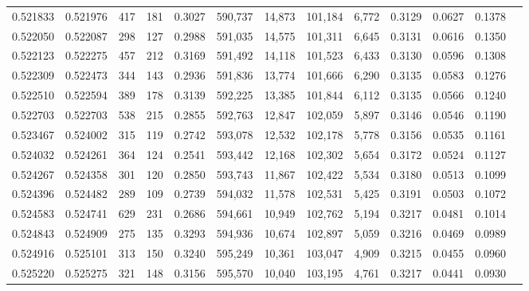 \begin{tabular}{rrrrrrrrrrrrr}
0.521833 & 0.521976 &   417 &   181 &                                     0.3027 & 590,737 &  14,873 & 101,184 &   6,772 & 0.3129 & 0.0627 & 0.1378 \\
0.522050 & 0.522087 &   298 &   127 &                                     0.2988 & 591,035 &  14,575 & 101,311 &   6,645 & 0.3131 & 0.0616 & 0.1350 \\
0.522123 & 0.522275 &   457 &   212 &                                     0.3169 & 591,492 &  14,118 & 101,523 &   6,433 & 0.3130 & 0.0596 & 0.1308 \\
0.522309 & 0.522473 &   344 &   143 &                                     0.2936 & 591,836 &  13,774 & 101,666 &   6,290 & 0.3135 & 0.0583 & 0.1276 \\
0.522510 & 0.522594 &   389 &   178 &                                     0.3139 & 592,225 &  13,385 & 101,844 &   6,112 & 0.3135 & 0.0566 & 0.1240 \\
0.522703 & 0.522703 &   538 &   215 &                                     0.2855 & 592,763 &  12,847 & 102,059 &   5,897 & 0.3146 & 0.0546 & 0.1190 \\
0.523467 & 0.524002 &   315 &   119 &                                     0.2742 & 593,078 &  12,532 & 102,178 &   5,778 & 0.3156 & 0.0535 & 0.1161 \\
0.524032 & 0.524261 &   364 &   124 &                                     0.2541 & 593,442 &  12,168 & 102,302 &   5,654 & 0.3172 & 0.0524 & 0.1127 \\
0.524267 & 0.524358 &   301 &   120 &                                     0.2850 & 593,743 &  11,867 & 102,422 &   5,534 & 0.3180 & 0.0513 & 0.1099 \\
0.524396 & 0.524482 &   289 &   109 &                                     0.2739 & 594,032 &  11,578 & 102,531 &   5,425 & 0.3191 & 0.0503 & 0.1072 \\
0.524583 & 0.524741 &   629 &   231 &                                     0.2686 & 594,661 &  10,949 & 102,762 &   5,194 & 0.3217 & 0.0481 & 0.1014 \\
0.524843 & 0.524909 &   275 &   135 &                                     0.3293 & 594,936 &  10,674 & 102,897 &   5,059 & 0.3216 & 0.0469 & 0.0989 \\
0.524916 & 0.525101 &   313 &   150 &                                     0.3240 & 595,249 &  10,361 & 103,047 &   4,909 & 0.3215 & 0.0455 & 0.0960 \\
0.525220 & 0.525275 &   321 &   148 &                                     0.3156 & 595,570 &  10,040 & 103,195 &   4,761 & 0.3217 & 0.0441 & 0.0930 \\

\end{tabular}
